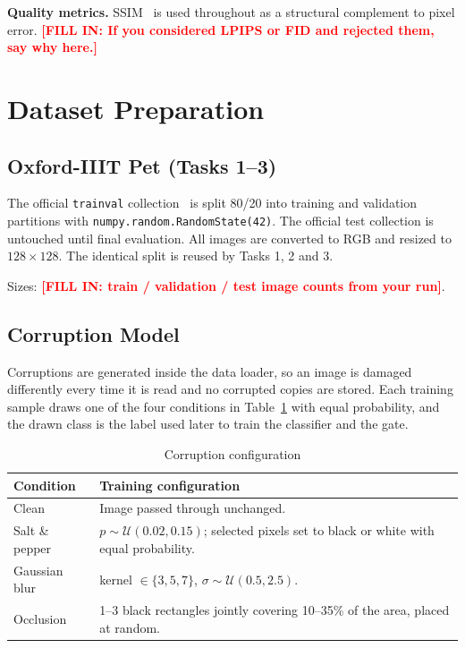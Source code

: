 \documentclass[conference]{IEEEtran}
\newcommand{\PLACEHOLDER}[1]{\textcolor{red}{\textbf{[FILL IN: #1]}}}
\begin{document}
\textbf{Quality metrics.} SSIM~\cite{wang2004} is used throughout as a
structural complement to pixel error. \PLACEHOLDER{If you considered LPIPS or
FID and rejected them, say why here.}

\section{Dataset Preparation}
\subsection{Oxford-IIIT Pet (Tasks 1--3)}
The official \texttt{trainval} collection~\cite{parkhi2012} is split 80/20 into
training and validation partitions with \texttt{numpy.random.RandomState(42)}.
The official test collection is untouched until final evaluation. All images
are converted to RGB and resized to $128\times128$. The identical split is
reused by Tasks 1, 2 and 3.

Sizes: \PLACEHOLDER{train / validation / test image counts from your run}.

\subsection{Corruption Model}
Corruptions are generated inside the data loader, so an image is damaged
differently every time it is read and no corrupted copies are stored. Each
training sample draws one of the four conditions in
Table~\ref{tab:corruptions} with equal probability, and the drawn class is the
label used later to train the classifier and the gate.

\begin{table}[t]
\caption{Corruption configuration}
\label{tab:corruptions}
\centering
\begin{tabular}{@{}lp{5.4cm}@{}}
\toprule
\textbf{Condition} & \textbf{Training configuration} \\
\midrule
Clean & Image passed through unchanged. \\
Salt \& pepper & $p \sim \mathcal{U}(0.02, 0.15)$; selected pixels set to
  black or white with equal probability. \\
Gaussian blur & kernel $\in \{3,5,7\}$, $\sigma \sim \mathcal{U}(0.5, 2.5)$. \\
Occlusion & 1--3 black rectangles jointly covering 10--35\% of the area, placed
  at random. \\
\bottomrule
\end{tabular}
\end{table}
\end{document}
